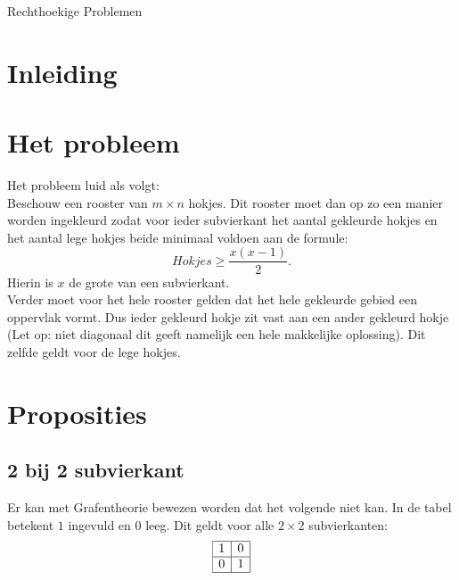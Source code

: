 \documentclass[11pt]{article}
\begin{document}
\begin{center}
\LARGE{Rechthoekige Problemen} \\
\end{center}

\section{Inleiding}


\section{Het probleem}
Het probleem luid als volgt:
\\
Beschouw een rooster van $m \times n$ hokjes. Dit rooster moet dan op zo een manier worden ingekleurd zodat voor ieder subvierkant het aantal gekleurde hokjes en het aantal lege hokjes beide minimaal voldoen aan de formule:
\[
Hokjes \geq \frac{x(x-1)}{2}.
\]
Hierin is $x$ de grote van een subvierkant.
\\
Verder moet voor het hele rooster gelden dat het hele gekleurde gebied een oppervlak vormt. Dus ieder gekleurd hokje zit vast aan een ander gekleurd hokje (Let op: niet diagonaal dit geeft namelijk een hele makkelijke oplossing). Dit zelfde geldt voor de lege hokjes.

\section{Proposities}
\subsection{2 bij 2 subvierkant}
Er kan met Grafentheorie bewezen worden dat het volgende niet kan. In de tabel betekent $1$ ingevuld en $0$ leeg. Dit geldt voor alle $2 \times 2$ subvierkanten:
\[
\begin{array}{|r|r|}
\hline
1 & 0 \\
\hline
0 & 1 \\
\hline
\end{array}
\]
\end{document}
